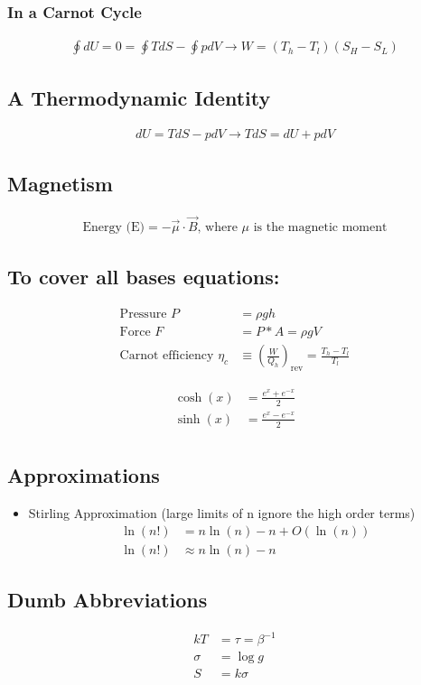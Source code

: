 \subsubsection*{In a Carnot Cycle}
\begin{align}
	\oint dU = 0 = \oint TdS - \oint pdV \rightarrow W = (T_h - T_l) (S_H - S_L)
\end{align}

\subsection*{A Thermodynamic Identity}
\begin{align}
	dU = TdS -pdV \rightarrow	TdS = dU + p dV
\end{align}

\subsection*{Magnetism}
\begin{align}
	\text{Energy (E)} = -\vec{\mu} \cdot \vec{B} \text{, where $\mu$ is the magnetic moment}
\end{align}

\subsection*{To cover all bases equations:}
\begin{align}
	\text{Pressure } P               & = \rho g h                                                \\
	\text{Force } F                  & = P * A = \rho g V                                        \\
	\text{Carnot efficiency } \eta_c & \equiv (\frac{W}{Q_h})_\text{rev} = \frac{T_h - T_l}{T_l}
\end{align}

\begin{align}
	\cosh(x) & = \frac{e^x + e^{-x}}{2} \\
	\sinh(x) & = \frac{e^x - e^{-x}}{2} \\
\end{align}
\subsection*{Approximations}

\begin{itemize}
	\item Stirling Approximation (large limits of n ignore the high order terms)
	      \begin{align*}
		      \ln(n!) & = n \ln(n) - n + O(\ln(n)) \\
		      \ln(n!) & \approx n \ln(n) - n
	      \end{align*}
\end{itemize}


\subsection*{Dumb Abbreviations}
\begin{align*}
	k T    & = \tau  = \beta^{-1} \\
	\sigma & = \log g             \\
	S      & = k \sigma
\end{align*}
